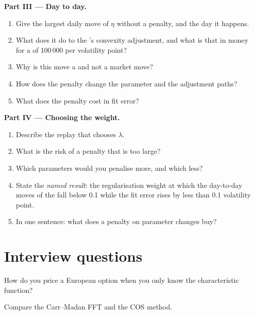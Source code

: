 \begin{problem}
\medskip\noindent\textbf{Part III --- Day to day.}
\begin{enumerate}[resume]
\item Give the largest daily move of $\eta$ without a penalty, and the day it happens.
\item What does it do to the 's convexity adjustment, and what is that in money for a  of 100\,000 per volatility point?
\item Why is this move a  and not a market move?
\item How does the penalty change the parameter and the adjustment paths?
\item What does the penalty cost in fit error?
\end{enumerate}

\medskip\noindent\textbf{Part IV --- Choosing the weight.}
\begin{enumerate}[resume]
\item Describe the replay that chooses $\lambda$.
\item What is the risk of a penalty that is too large?
\item Which parameters would you penalise more, and which less?
\item State the \emph{named result}: the regularisation weight at which the day-to-day moves of the  fall below 0.1 while the
fit error rises by less than 0.1 volatility point.
\item In one sentence: what does a penalty on parameter changes buy?
\end{enumerate}
\end{problem}

\section{Interview questions}

\begin{interviewq}\label{iq:dv:fourier-pricing-and-calibration-engineering:1}
How do you price a European option when you only know the characteristic function?
\end{interviewq}

\begin{interviewq}\label{iq:dv:fourier-pricing-and-calibration-engineering:2}
Compare the Carr--Madan FFT and the COS method.
\end{interviewq}

